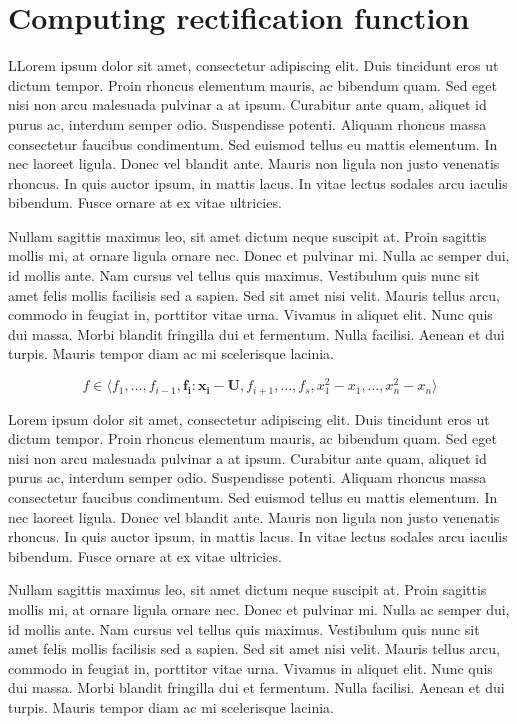 \section{Computing rectification function}

LLorem ipsum dolor sit amet, consectetur adipiscing elit. Duis tincidunt eros ut dictum tempor. Proin rhoncus elementum mauris, ac bibendum quam. Sed eget nisi non arcu malesuada pulvinar a at ipsum. Curabitur ante quam, aliquet id purus ac, interdum semper odio. Suspendisse potenti. Aliquam rhoncus massa consectetur faucibus condimentum. Sed euismod tellus eu mattis elementum. In nec laoreet ligula. Donec vel blandit ante. Mauris non ligula non justo venenatis rhoncus. In quis auctor ipsum, in mattis lacus. In vitae lectus sodales arcu iaculis bibendum. Fusce ornare at ex vitae ultricies.

Nullam sagittis maximus leo, sit amet dictum neque suscipit at. Proin sagittis mollis mi, at ornare ligula ornare nec. Donec et pulvinar mi. Nulla ac semper dui, id mollis ante. Nam cursus vel tellus quis maximus. Vestibulum quis nunc sit amet felis mollis facilisis sed a sapien. Sed sit amet nisi velit. Mauris tellus arcu, commodo in feugiat in, porttitor vitae urna. Vivamus in aliquet elit. Nunc quis dui massa. Morbi blandit fringilla dui et fermentum. Nulla facilisi. Aenean et dui turpis. Mauris tempor diam ac mi scelerisque lacinia.

\begin{equation}
\label{eq:eqn1}
    f \in \langle f_1,\dots,f_{i-1},\boldsymbol{f_i: x_i - U},f_{i+1},\dots,f_s,x_1^2-x_1,\dots,x_n^2-x_n \rangle
\end{equation}

Lorem ipsum dolor sit amet, consectetur adipiscing elit. Duis tincidunt eros ut dictum tempor. Proin rhoncus elementum mauris, ac bibendum quam. Sed eget nisi non arcu malesuada pulvinar a at ipsum. Curabitur ante quam, aliquet id purus ac, interdum semper odio. Suspendisse potenti. Aliquam rhoncus massa consectetur faucibus condimentum. Sed euismod tellus eu mattis elementum. In nec laoreet ligula. Donec vel blandit ante. Mauris non ligula non justo venenatis rhoncus. In quis auctor ipsum, in mattis lacus. In vitae lectus sodales arcu iaculis bibendum. Fusce ornare at ex vitae ultricies.

Nullam sagittis maximus leo, sit amet dictum neque suscipit at. Proin sagittis mollis mi, at ornare ligula ornare nec. Donec et pulvinar mi. Nulla ac semper dui, id mollis ante. Nam cursus vel tellus quis maximus. Vestibulum quis nunc sit amet felis mollis facilisis sed a sapien. Sed sit amet nisi velit. Mauris tellus arcu, commodo in feugiat in, porttitor vitae urna. Vivamus in aliquet elit. Nunc quis dui massa. Morbi blandit fringilla dui et fermentum. Nulla facilisi. Aenean et dui turpis. Mauris tempor diam ac mi scelerisque lacinia.

